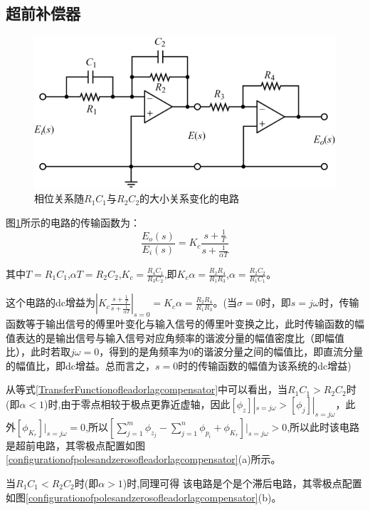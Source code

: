\documentclass{article}
\numberwithin{equation}{section}
\numberwithin{figure}{section}
\begin{document}
\subsection{超前补偿器}
\begin{figure}
    \centering
    \includegraphics[width=.4\textwidth]{Chapter6/leadorlagcompensator.png} %
    \caption{相位关系随$R_1C_1$与$R_2C_2$的大小关系变化的电路} %
    \label{leadorlagcompensator} %
\end{figure}

图\ref{leadorlagcompensator}所示的电路的传输函数为：
\begin{equation}
    \frac{E_o(s)}{E_i(s)}=K_c\frac{s+\frac{1}{T}}{s+\frac{1}{\alpha T}}\label{TransferFunctionofleadorlagcompensator}
\end{equation}

其中$T=R_1C_1$,$\alpha T=R_2C_2$,$K_c=\frac{R_4C_1}{R_3C_2}$,即$K_c\alpha =\frac{R_2R_4}{R_1R_3}$,$\alpha =\frac{R_2C_2}{R_1C_1}$。

这个电路的dc增益为$|K_c\frac{s+\frac{1}{T}}{s+\frac{1}{\alpha T}}|_{s=0}=K_c\alpha =\frac{R_2R_4}{R_1R_3}$。(当$\sigma=0$时，即$s=j\omega$时，传输函数等于输出信号的傅里叶变化与输入信号的傅里叶变换之比，此时传输函数的幅值表达的是输出信号与输入信号对应角频率的谐波分量的幅值密度比（即幅值比），此时若取$j\omega=0$，得到的是角频率为0的谐波分量之间的幅值比，即直流分量的幅值比，即dc增益。总而言之，$s=0$时的传输函数的幅值为该系统的dc增益)

从等式\ref{TransferFunctionofleadorlagcompensator}中可以看出，当$R_1C_1>R_2C_2$时(即$\alpha < 1$)时,由于零点相较于极点更靠近虚轴，因此$[\phi_z]|_{s=j\omega}>[\phi_j]|_{s=j\omega}$，此外$[\phi_{K_r}]|_{s=j\omega}=0$,所以$[\sum_{j=1}^{m}\phi_{z_j}-\sum_{j=1}^{n}\phi_{p_i}+\phi_{K_r}]|_{s=j\omega}>0$,所以此时该电路是超前电路，其零极点配置如图\ref{configurationofpolesandzerosofleadorlagcompensator}(a)所示。

当$R_1C_1<R_2C_2$时(即$\alpha > 1$)时,同理可得
该电路是个是个滞后电路，其零极点配置如图\ref{configurationofpolesandzerosofleadorlagcompensator}(b)。
\end{document}
